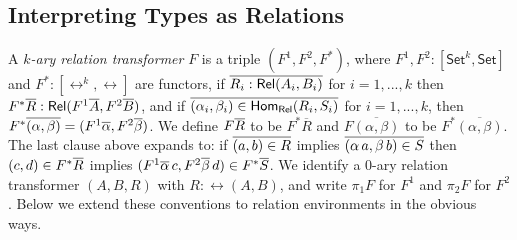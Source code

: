 \documentclass[runningheads]{llncs}
\newcommand{\set}{\mathsf{Set}}
\begin{document}
\subsection{Interpreting Types as Relations}\label{sec:rel-interp}

\vspace*{-0.01in}

A {\em $k$-ary relation transformer} $F$ is a triple $(F^1, F^2,F^*)$,
where $F^1,F^2 : [\set^k,\set]$ and $F^* : [\rel^k, \rel]$ are
functors, if $\overline{R_i:\mathsf{Rel}(A_i,B_i)}$ for $i = 1,...,k$ then $F^*
\overline{R} : \mathsf{Rel}(F^1 \overline{A}, F^2 \overline{B})$, and if $\overline{(\alpha_i,
  \beta_i) \in \mathsf{Hom_{Rel}}(R_i,S_i)}$ for $i = 1,...,k$, then $F^*
\overline{(\alpha, \beta)} = (F^1 \overline{\alpha}, F^2 \overline{\beta})$.  We define
$F\overline{R}$ to be $F^*\overline{R}$ and $F\overline{(\alpha,\beta)}$ to
be $F^*\overline{(\alpha,\beta)}$.  The last clause above expands to:
if $\overline{(a,b) \in R}$ implies $\overline{(\alpha\,a,\beta\,b) \in S}$ then
$(c,d) \in F^*\overline{R}$ implies $(F^1 \overline{\alpha}\,c,F^2 \overline{\beta}\,d)
\in F^*\overline{S}$.  We identify a $0$-ary relation transformer $(A,B,R)$
with $R : \rel(A,B)$, and write $\pi_1 F$ for $F^1$ and $\pi_2 F$ for
$F^2$.  Below we extend these conventions to relation environments in
the obvious ways.
\end{document}
